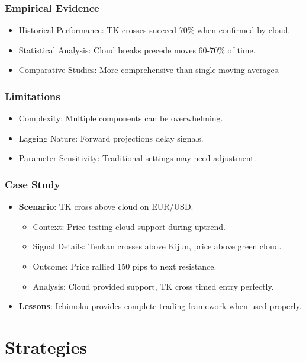 \documentclass[12pt]{article}
\begin{document}
\subsubsection{Empirical Evidence}
\begin{itemize}
\item Historical Performance: TK crosses succeed 70\% when confirmed by cloud.
\item Statistical Analysis: Cloud breaks precede moves 60-70\% of time.
\item Comparative Studies: More comprehensive than single moving averages.
\end{itemize}

\subsubsection{Limitations}
\begin{itemize}
\item Complexity: Multiple components can be overwhelming.
\item Lagging Nature: Forward projections delay signals.
\item Parameter Sensitivity: Traditional settings may need adjustment.
\end{itemize}

\subsubsection{Case Study}
\begin{itemize}
\item \textbf{Scenario}: TK cross above cloud on EUR/USD.
  \begin{itemize}
  \item Context: Price testing cloud support during uptrend.
  \item Signal Details: Tenkan crosses above Kijun, price above green cloud.
  \item Outcome: Price rallied 150 pips to next resistance.
  \item Analysis: Cloud provided support, TK cross timed entry perfectly.
  \end{itemize}
\item \textbf{Lessons}: Ichimoku provides complete trading framework when used properly.
\end{itemize}

\section{Strategies}
\label{sec:strategies}
\end{document}
